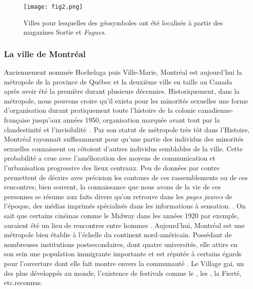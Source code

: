 \begin{figure}[ht]
 \begin{center}
 \texttt{[image: fig2.png]}
 \end{center}
 \caption{Villes pour lesquelles des géosymboles ont été localisés à partir des
 magazines Sortie et \emph{Fugues}.}\label{fig:carte_quebec}
\end{figure}

\subsubsection{La ville de Montréal}
\label{ssub:montreal}
Anciennement nommée Hochelaga puis Ville-Marie, Montréal est aujourd'hui la métropole de la province de Québec et la deuxième ville en taille au Canada après avoir été la première durant plusieurs décennies.
Historiquement, dans la métropole, nous pouvons croire qu'il exista pour les minorités sexuelles une forme d'organisation durant pratiquement toute l'histoire de la colonie canadienne-française jusqu’aux années 1950, organisation marquée avant tout par la clandestinité et l'invisibilité~\citep{Higgins1999}.
Par son statut de métropole très tôt dans l'Histoire, Montréal rayonnait suffisamment pour qu'une partie des individus des minorités sexuelles connaissent ou côtoient d'autres individus semblables de la ville.
Cette probabilité a crue avec l'amélioration des moyens de communication et l'urbanisation progressive des lieux centraux.
Peu de données par contre permettent de décrire avec précision les contours de ces rassemblements ou de ces rencontres; bien souvent, la connaissance que nous avons de la vie de ces personnes se résume aux faits divers qu'on retrouve dans les \emph{pages jaunes} de l'époque, des médias imprimés spécialisés dans les informations à sensation.
\citep[]{Higgins1999}.
On sait que certains cinémas comme le Midway dans les années 1920 par exemple, auraient été un lieu de rencontres entre hommes\citep[30]{Higgins1999} .
Aujourd'hui, Montréal est une métropole bien établie à l'échelle du continent nord-américain.
Possédant de nombreuses institutions postsecondaires, dont quatre universités, elle attire en son sein une population immigrante importante et est réputée à certains égards pour l'ouverture dont elle fait montre envers la communauté \lgbt{}.
Le Village gai, un des plus développés au monde, l'existence de festivals comme le , les , la Fierté, etc.\@sont reconnus.

